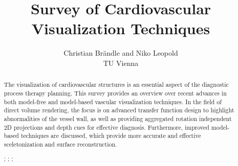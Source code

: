 \documentclass{egpubl}
\title{Survey of Cardiovascular Visualization Techniques}
\author[C. Br{\"a}ndle \& N. Leopold]{Christian Br{\"a}ndle and Niko Leopold\\TU Vienna\\}
\begin{document}
\graphicspath{{images/}}

\maketitle


\begin{abstract}
	The visualization of cardiovascular structures is an essential aspect of 
    the diagnostic process therapy planning. This survey provides an overview
    over recent advances in both model-free and model-based vascular visualization techniques.
    In the field of direct volume rendering, the focus is on advanced transfer function design to         
	highlight abnormalities of the vessel wall, as well as providing aggregated rotation independent
	2D projections and depth cues for effective diagnosis.
	Furthermore, improved model-based techniques are discussed, which provide 
	more accurate and effective sceletonization and surface reconstruction.
		
	\begin{classification} %
		;
		;
		;
	\end{classification}
	
\end{abstract}







%




%

%


\end{document}
